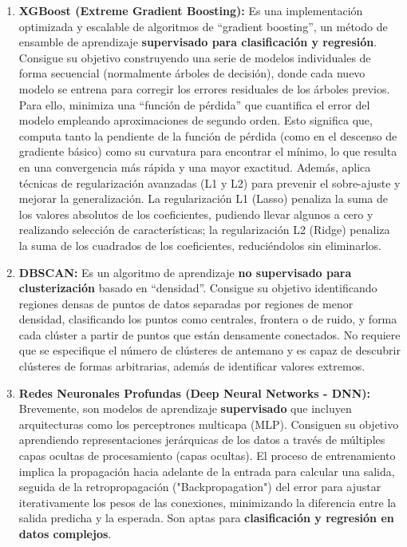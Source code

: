 \begin{enumerate}
\begin{enumerate}
\begin{enumerate}
		\item \textbf{XGBoost (Extreme Gradient Boosting):}
		Es una implementación optimizada y escalable de algoritmos de ``gradient boosting'', un método de ensamble de aprendizaje \textbf{supervisado para clasificación y regresión}. Consigue su objetivo construyendo una serie de modelos individuales de forma secuencial (normalmente árboles de decisión), donde cada nuevo modelo se entrena para corregir los errores residuales de los árboles previos. Para ello, minimiza una ``función de pérdida'' que cuantifica el error del modelo empleando aproximaciones de segundo orden. Esto significa que, computa tanto la pendiente de la función de pérdida (como en el descenso de gradiente básico) como su curvatura para encontrar el mínimo, lo que resulta en una convergencia más rápida y una mayor exactitud. Además, aplica técnicas de regularización avanzadas (L1 y L2) para prevenir el sobre-ajuste y mejorar la generalización. La regularización L1 (Lasso) penaliza la suma de los valores absolutos de los coeficientes, pudiendo llevar algunos a cero y realizando selección de características; la regularización L2 (Ridge) penaliza la suma de los cuadrados de los coeficientes, reduciéndolos sin eliminarlos.
		
		\item \textbf{DBSCAN:}
		Es un algoritmo de aprendizaje \textbf{no supervisado para clusterización} basado en ``densidad''. Consigue su objetivo identificando regiones densas de puntos de datos separadas por regiones de menor densidad, clasificando los puntos como centrales, frontera o de ruido, y forma cada clúster a partir de puntos que están densamente conectados. No requiere que se especifique el número de clústeres de antemano y es capaz de descubrir clústeres de formas arbitrarias, además de identificar valores extremos.
		
		\item \textbf{Redes Neuronales Profundas (Deep Neural Networks - DNN):}
		Brevemente, son modelos de aprendizaje \textbf{supervisado} que incluyen arquitecturas como los perceptrones multicapa (MLP). Consiguen su objetivo aprendiendo representaciones jerárquicas de los datos a través de múltiples capas ocultas de procesamiento (capas ocultas). El proceso de entrenamiento implica la propagación hacia adelante de la entrada para calcular una salida, seguida de la retropropagación ("Backpropagation") del error para ajustar iterativamente los pesos de las conexiones, minimizando la diferencia entre la salida predicha y la esperada. Son aptas para \textbf{clasificación y regresión en datos complejos}.
		

\end{enumerate}
\end{enumerate}
\end{enumerate}
